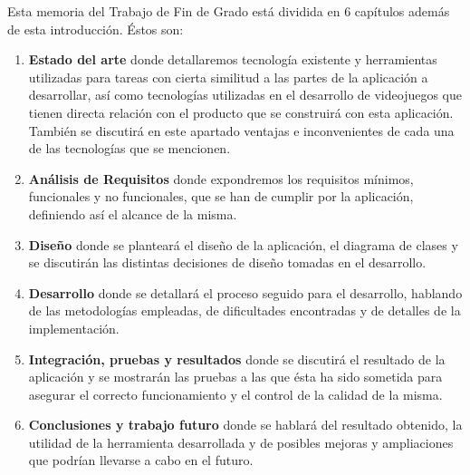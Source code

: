 Esta memoria del Trabajo de Fin de Grado está dividida en 6 capítulos además de esta introducción. Éstos son:

\begin{enumerate}
	\item \textbf{Estado del arte} donde detallaremos tecnología existente y herramientas utilizadas para tareas con cierta similitud a las partes de la aplicación a desarrollar, así como tecnologías utilizadas en el desarrollo de videojuegos que tienen directa relación con el producto que se construirá con esta aplicación. También se discutirá en este apartado ventajas e inconvenientes de cada una de las tecnologías que se mencionen.
	\item \textbf{Análisis de Requisitos} donde expondremos los requisitos mínimos, funcionales y no funcionales, que se han de cumplir por la aplicación, definiendo así el alcance de la misma.
	\item \textbf{Diseño} donde se planteará el diseño de la aplicación, el diagrama de clases y se discutirán las distintas decisiones de diseño tomadas en el desarrollo.
	\item \textbf{Desarrollo} donde se detallará el proceso seguido para el desarrollo, hablando de las metodologías empleadas, de dificultades encontradas y de detalles de la implementación.
	\item \textbf{Integración, pruebas y resultados} donde se discutirá el resultado de la aplicación y se mostrarán las pruebas a las que ésta ha sido sometida para asegurar el correcto funcionamiento y el control de la calidad de la misma.
	\item \textbf{Conclusiones y trabajo futuro} donde se hablará del resultado obtenido, la utilidad de la herramienta desarrollada y de posibles mejoras y ampliaciones que podrían llevarse a cabo en el futuro.
\end{enumerate}